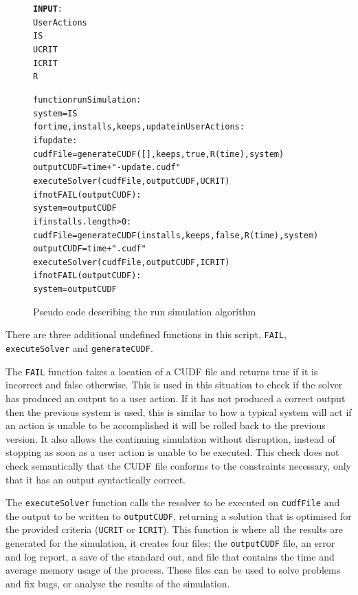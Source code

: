 \begin{figure}[htp]
\begin{center}
\begin{alltt}
\textbf{INPUT}:
UserActions
IS
UCRIT
ICRIT
R

function runSimulation:
    system = IS
    for time,installs,keeps,update in UserActions:
        if update:
            cudfFile = generateCUDF([],keeps,true,R(time),system)        
            outputCUDF  = time + "-update.cudf"
            executeSolver(cudfFile, outputCUDF, UCRIT)
            if not FAIL(outputCUDF):
                system = outputCUDF
        if installs.length > 0:
            cudfFile = generateCUDF(installs,keeps,false,R(time),system)        
            outputCUDF  = time + ".cudf"
            executeSolver(cudfFile, outputCUDF, ICRIT)
            if not FAIL(outputCUDF):
                system = outputCUDF
            
\end{alltt}
\caption[Execute Simulation]{Pseudo code describing the run simulation algorithm}
\label{executeSimulation}
\end{center}
\end{figure}

There are three additional undefined functions in this script, \verb+FAIL+, \verb+executeSolver+ and \verb+generateCUDF+.

The \verb+FAIL+ function takes a location of a CUDF file and returns true if it is incorrect and false otherwise.
This is used in this situation to check if the solver has produced an output to a user action.
If it has not produced a correct output then the previous system is used, 
this is similar to how a typical system will act if an action is unable to be accomplished it will be rolled back to the previous version.
It also allows the continuing simulation without disruption, instead of stopping as soon as a user action is unable to be executed.
This check does not check semantically that the CUDF file conforms to the constraints necessary, only that it has an output syntactically correct.

The \verb+executeSolver+ function calls the resolver to be executed on \verb+cudfFile+ and the output to be written to \verb+outputCUDF+, 
returning a solution that is optimised for the provided criteria (\verb+UCRIT+ or \verb+ICRIT+).
This function is where all the results are generated for the simulation, it creates four files;
the \verb+outputCUDF+ file, an error and log report, a save of the standard out, and file that contains the time and average memory usage of the process.
These files can be used to solve problems and fix bugs, or analyse the results of the simulation.

